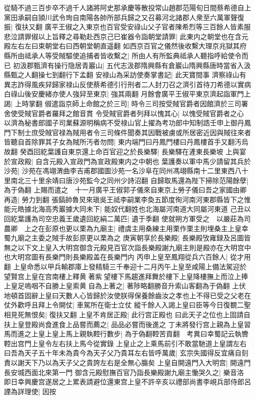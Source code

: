 從騎不過三百步卒不過千人諸將阿史那承慶等散投常山趙郡范陽旬日間蔡希德自上黨田承嗣自頴川武令珣自南陽各帥所部兵歸之又召募河北諸郡人衆至六萬軍聲復振|{
	復扶又翻}
廣平王俶之入東京也百官受安祿山父子官者陳希烈等三百餘人皆素服悲泣請罪俶以上旨釋之尋勒赴西京己巳崔器令詣朝堂請罪|{
	此東内之朝堂也在含元殿左右左曰束朝堂右曰西朝堂朝直遥翻}
如西京百官之儀然後收繫大理京兆獄其府縣所由祗承人等受賊驅使追捕者皆收繫之|{
	所由人有所監典祗承人聽指呼給使令而已}
初汲郡甄濟有操行隐居青巖山|{
	五代志汲郡隋興縣有倉巖山隋興縣唐時當省入汲縣甄之人翻操七到翻行下孟翻}
安禄山為采訪使奏掌書記|{
	此天寶間事}
濟察祿山有異志詐得風疾舁歸家禄山反使蔡希德引行刑者二人封刀召之濟引首待刀希德以實病白祿山後安慶緒亦使人強舁至東京|{
	強其兩翻}
月餘會廣平王俶平東京濟起詣軍門上謁|{
	上時掌翻}
俶遣詣京師上命館之於三司|{
	時令三司按受賊官爵者因館濟於三司署舍使受賊官爵者羅拜之館音貫}
令受賊官爵者列拜以愧其心|{
	以愧受賊官爵者之心}
以濟為秘書郎國子司業蘇源明稱病不受禄山官上擢為考功郎中知制誥壬申上御丹鳳門下制士庶受賊官禄為賊用者令三司條件聞奏其因戰被虜或所居密近因與賊往來者皆聽自首除罪其子女為賊所汚者勿問|{
	東内端門曰丹鳳門樓曰丹鳳樓首手又翻汚烏故翻}
癸酉回紇葉護自東京還上命百官迎之於長樂驛|{
	長樂驛在滻東長樂坡}
上與宴於宣政殿|{
	自含元殿入宣政門為宣政殿東内之中朝也}
葉護奏以軍中馬少請留其兵於沙苑|{
	沙苑在馮翊渭曲李吉甫郡國圖沙苑一名沙阜在同州馮翊縣南十二里東西八十里南北三十里余靖曰唐沙苑監今之同州少詩沼翻}
自歸取馬還為陛下掃除范陽餘孽|{
	為于偽翻}
上賜而遣之　十一月廣平王俶郭子儀來自東京上勞子儀曰吾之家國由卿再造|{
	勞力到翻}
張鎬帥魯炅來瑱吳王祗李嗣業李奐五節度徇河南河東郡縣皆下之惟能元皓據北海高秀巖據大同未下|{
	能奴代翻姓也北海屬河南道大同屬河東道}
己丑以回紇葉護為司空忠義王歲遺回紇絹二萬匹|{
	遺于季翻}
使就朔方軍受之　以嚴莊為司農卿　上之在彭原也更以栗為九廟主|{
	禮虞主用桑練主用栗作栗主則埋桑主上皇幸蜀九廟之主委之賊手故彭原更以栗為之}
庚寅朝享於長樂殿|{
	長樂殿攷雍録及呂圖皆無之以下文上皇入大明宫御含元殿見百官次詣長樂殿謝九廟主則是殿亦在大明宫中也大明宫圖有長樂門則長樂殿盖在長樂門内}
丙申上皇至鳳翔從兵六百餘人|{
	從才用翻}
上皇命悉以甲兵輸郡庫上發精騎三千奉迎十二月丙午上皇至咸陽上備法駕迎於望賢宫上皇在宫南樓上釋黄著紫望樓下馬趨進拜舞於樓下上皇降樓撫上而泣上捧上皇足嗚咽不自勝上皇索黄自為上著之|{
	著陟略翻勝音升索山客翻為于偽翻}
上伏地頓首固辭上皇曰天數人心皆歸於汝使朕得保養餘齒汝之孝也上不得已受之父老在仗外歡呼且拜上令開仗|{
	車駕所在衛士立仗}
縱千餘人入謁上皇曰臣等今日復覩二聖相見死無恨矣|{
	復扶又翻}
上皇不肯居正殿|{
	此行宫正殿也}
曰此天子之位也上固請自扶上皇登殿尚食進食上品嘗而薦之|{
	品品必嘗而後進之}
丁未將發行宫上親為上皇習馬而進之上皇上皇上馬上親執鞚行數步|{
	為于偽翻鞚苦貢翻　考異曰幸蜀記云執轡鞚出宫門上皇令左右扶上馬今從實錄}
上皇止之上乘馬前引不敢當馳道上皇謂左右曰吾為天子五十年未為貴今為天子父乃貴耳左右皆呼萬歲|{
	玄宗失國得反宜痛自刻責以謝天下乃以為天子父之貴誇左右是全無心膓矣}
上皇自開遠門入大明宫|{
	開遠門長安城西面北來第一門}
御含元殿慰撫百官乃詣長樂殿謝九廟主慟哭久之|{
	樂音洛}
即日幸興慶宫遂居之上累表請避位還東宫上皇不許辛亥以禮部尚書李峴兵部侍郎呂諲為詳理使|{
	因按}


